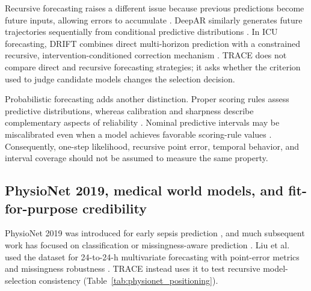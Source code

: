 \documentclass[preprint,12pt]{elsarticle}
\begin{document}
Recursive forecasting raises a different issue because previous predictions become future inputs, allowing errors to accumulate \cite{bentaieb2012multistep}. DeepAR similarly generates future trajectories sequentially from conditional predictive distributions \cite{salinas2020deepar}. In ICU forecasting, DRIFT combines direct multi-horizon prediction with a constrained recursive, intervention-conditioned correction mechanism \cite{liu2026drift}. TRACE does not compare direct and recursive forecasting strategies; it asks whether the criterion used to judge candidate models changes the selection decision.

Probabilistic forecasting adds another distinction. Proper scoring rules assess predictive distributions, whereas calibration and sharpness describe complementary aspects of reliability \cite{gneiting2007scoring,gneiting2007calibration}. Nominal predictive intervals may be miscalibrated even when a model achieves favorable scoring-rule values \cite{gneiting2007calibration}. Consequently, one-step likelihood, recursive point error, temporal behavior, and interval coverage should not be assumed to measure the same property.

\subsection{PhysioNet 2019, medical world models, and fit-for-purpose credibility}

PhysioNet 2019 was introduced for early sepsis prediction \cite{reyna2020sepsis}, and much subsequent work has focused on classification or missingness-aware prediction \cite{singh2021missingness,kim2024temporalprior}. Liu et al. used the dataset for 24-to-24-h multivariate forecasting with point-error metrics and missingness robustness \cite{liu2026mtfpdg}. TRACE instead uses it to test recursive model-selection consistency (Table~\ref{tab:physionet_positioning}).
\end{document}
